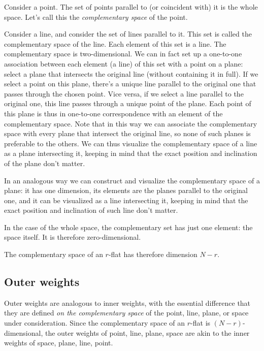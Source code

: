 \documentclass[\ifafour a4paper,12pt,\else a5paper,10pt,\fi%
onecolumn,oneside,article,%
british%
]{memoir}
\theoremstyle{remark}
\theoremstyle{innote}
\renewcommand*{\|}{\nonscript\,\vert\nonscript\;\mathopen{}}
\begin{document}
Consider a point. The set of points parallel to (or coincident with) it is
the whole space. Let's call this the \emph{complementary space} of the point.

Consider a line, and consider the set of lines parallel to it. This set is
called the complementary space of the line. Each element of this set is a
line. The complementary space is two-dimensional. We can in fact set up a
one-to-one association between each element (a line) of this set with a
point on a plane: select a plane that intersects the original line (without
containing it in full). If we select a point on this plane, there's a
unique line parallel to the original one that passes through the chosen
point. Vice versa, if we select a line parallel to the original one, this
line passes through a unique point of the plane. Each point of this plane
is thus in one-to-one correspondence with an element of the complementary
space. Note that in this way we can associate the complementary space with
every plane that intersect the original line, so none of such planes is
preferable to the others. We can thus visualize the complementary space of
a line as a plane intersecting it, keeping in mind that the exact position
and inclination of the plane don't matter.

In an analogous way we can construct and visualize the complementary space
of a plane: it has one dimension, its elements are the planes parallel to
the original one, and it can be visualized as a line intersecting it,
keeping in mind that the exact position and inclination of such line don't
matter.

In the case of the whole space, the complementary set has just one element:
the space itself. It is therefore zero-dimensional.

The complementary space of an $r$-flat has therefore dimension $N-r$.



\subsection{Outer weights}
\label{sec:outer_weights}

Outer weights are analogous to inner weights, with the essential difference
that they are defined \emph{on the complementary space} of the point, line,
plane, or space under consideration. Since the complementary space of an
$r$-flat is $(N-r)$-dimensional, the outer weights of point, line, plane,
space are akin to the inner weights of space, plane, line, point.
\end{document}
